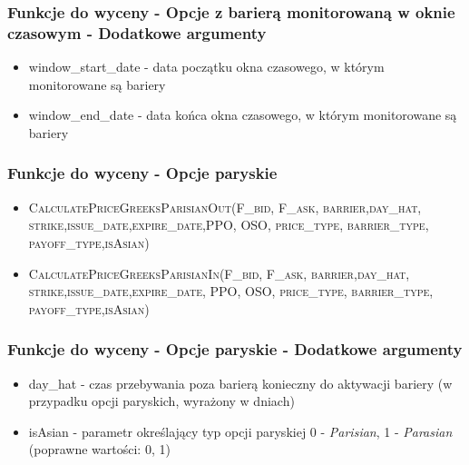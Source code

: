 \documentclass{beamer}
\begin{document}
\begin{frame}
  \frametitle{Funkcje do wyceny - Opcje z barierą monitorowaną w oknie czasowym - Dodatkowe argumenty}

\begin{itemize}
\item window\_start\_date - data początku okna czasowego, w którym monitorowane są bariery
\item window\_end\_date - data końca okna czasowego, w którym monitorowane są bariery
\end{itemize}

\end{frame}



\begin{frame}
  \frametitle{Funkcje do wyceny - Opcje paryskie}
  \begin{itemize}
  \item \small \textsc{CalculatePriceGreeksParisianOut(F\_bid, F\_ask, barrier,day\_hat, strike,issue\_date,expire\_date,PPO, OSO, price\_type, barrier\_type, payoff\_type,isAsian)}
  \item \small \textsc{CalculatePriceGreeksParisianIn(F\_bid, F\_ask, barrier,day\_hat, strike,issue\_date,expire\_date, PPO, OSO, price\_type, barrier\_type, payoff\_type,isAsian)}

  \end{itemize}
\end{frame}

\begin{frame}
  \frametitle{Funkcje do wyceny - Opcje paryskie - Dodatkowe argumenty}

\begin{itemize}
\item day\_hat - czas przebywania poza barierą konieczny do aktywacji bariery (w przypadku opcji paryskich, wyrażony w dniach)
\item isAsian - parametr określający typ opcji paryskiej 0 - \emph{Parisian}, 1 - \emph{Parasian} (poprawne wartości: 0, 1)
\end{itemize}

\end{frame}
\end{document}

